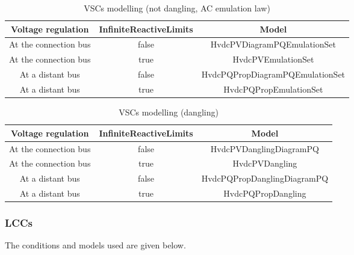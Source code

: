 \documentclass[a4paper, 12pt]{report}
\begin{document}
\begin{table}[ht!]
\center
\begin{tabular}{ c | c | c}
\toprule
\footnotesize{\textbf{{Voltage regulation}}}& \footnotesize{\textbf{{InfiniteReactiveLimits}}} & \small{\textbf{{Model}}} \\
\midrule
\rowcolor{gray!10}
 \footnotesize{At the connection bus} & \small{false}& \footnotesize{HvdcPVDiagramPQEmulationSet} \\
\rowcolor{white}
 \footnotesize{At the connection bus} & \small{true}& \footnotesize{HvdcPVEmulationSet} \\
\rowcolor{gray!10}
 \footnotesize{At a distant bus} & \small{false} & \footnotesize{HvdcPQPropDiagramPQEmulationSet} \\
\rowcolor{white}
 \footnotesize{At a distant bus} & \small{true} & \footnotesize{HvdcPQPropEmulationSet} \\
\bottomrule
\end{tabular}
\caption{VSCs modelling (not dangling, AC emulation law)}
\end{table}

\begin{table}[ht!]
\center
\begin{tabular}{ c | c | c }
\toprule
\footnotesize{\textbf{{Voltage regulation}}}& \footnotesize{\textbf{{InfiniteReactiveLimits}}} & \small{\textbf{{Model}}} \\
\midrule
\rowcolor{gray!10}
 \footnotesize{At the connection bus} & \small{false}& \footnotesize{HvdcPVDanglingDiagramPQ} \\
\rowcolor{white}
 \footnotesize{At the connection bus} & \small{true}& \footnotesize{HvdcPVDangling} \\
\rowcolor{gray!10}
 \footnotesize{At a distant bus} & \small{false} & \footnotesize{HvdcPQPropDanglingDiagramPQ} \\
\rowcolor{white}
 \footnotesize{At a distant bus} & \small{true} & \footnotesize{HvdcPQPropDangling} \\
\bottomrule
\end{tabular}
\caption{VSCs modelling (dangling)}
\end{table}

\subsubsection{LCCs}

The conditions and models used are given below.
\end{document}
